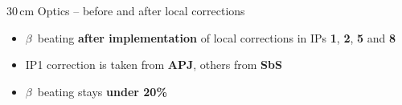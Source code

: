 \documentclass[4pt,usenames,dvipsnames,aspectratio=169,table]{beamer}
\newcommand{\highl}[1]{\textbf{#1}}
\newcommand{\bonelabel}{%
        \node at ($(b1) +(-0.13\linewidth, 0.16\linewidth)$) {\sffamily\small\textbf{Beam 1}};
}
\newcommand{\btwolabel}{%
        \node at ($(b1) +(-0.13\linewidth, 0.16\linewidth)$) {\sffamily\small\textbf{Beam 2}};
}
\begin{document}
\begin{frame}{30\,cm Optics -- before and after local corrections}

    \begin{center}
        \hfill
    \end{center}
    
    \begin{itemize}
        \item $\beta$~beating \highl{after implementation} of local corrections in IPs \textbf{1}, \textbf{2}, \textbf{5} and \textbf{8}
        \item IP1 correction is taken from \highl{APJ}, others from \highl{SbS}
        \item $\beta$~beating stays \highl{under 20\%}
    \end{itemize}
    
\end{frame}
\end{document}
